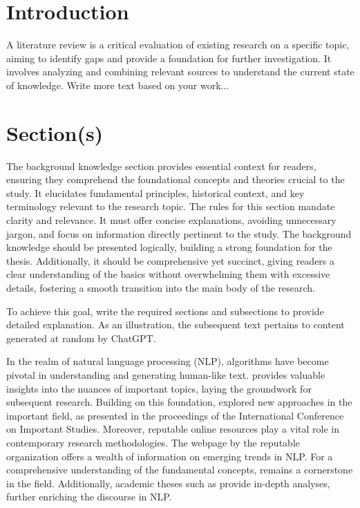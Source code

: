% 
\section{Introduction}
\label{literature:introduction}
% 
A literature review is a critical evaluation of existing research on a specific topic, aiming to identify gaps and provide a foundation for further investigation.
It involves analyzing and combining relevant sources to understand the current state of knowledge.
Write more text based on your work...


% 
\section{Section(s)}
\label{literature:section}
% 
The background knowledge section provides essential context for readers, ensuring they comprehend the foundational concepts and theories crucial to the study. It elucidates fundamental principles, historical context, and key terminology relevant to the research topic. The rules for this section mandate clarity and relevance. It must offer concise explanations, avoiding unnecessary jargon, and focus on information directly pertinent to the study. The background knowledge should be presented logically, building a strong foundation for the thesis. Additionally, it should be comprehensive yet succinct, giving readers a clear understanding of the basics without overwhelming them with excessive details, fostering a smooth transition into the main body of the research.

To achieve this goal, write the required sections and subsections to provide detailed explanation. As an illustration, the subsequent text pertains to content generated at random by ChatGPT.

In the realm of natural language processing (NLP), algorithms have become pivotal in understanding and generating human-like text. \cite{smith2010} provides valuable insights into the nuances of important topics, laying the groundwork for subsequent research. Building on this foundation, \cite{jones2015} explored new approaches in the important field, as presented in the proceedings of the International Conference on Important Studies. Moreover, reputable online resources play a vital role in contemporary research methodologies. The webpage by the reputable organization \cite{website2020} offers a wealth of information on emerging trends in NLP. For a comprehensive understanding of the fundamental concepts, \cite{johnson2008} remains a cornerstone in the field. Additionally, academic theses such as \cite{smith2005} provide in-depth analyses, further enriching the discourse in NLP.




